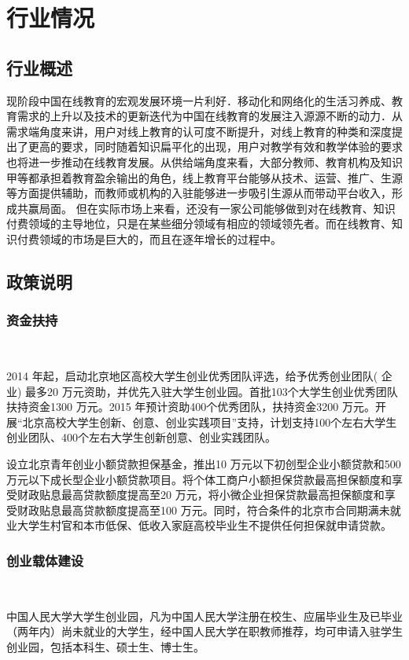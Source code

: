 \setcounter{page}{1}
\section{行业情况}
\subsection{行业概述}
现阶段中国在线教育的宏观发展环境一片利好．移动化和网络化的生活习养成、教育需求的上升以及技术的更新迭代为中国在线教育的发展注入源源不断的动力．从需求端角度来讲，用户对线上教育的认可度不断提升，对线上教育的种类和深度提出了更高的要求，同时随着知识扁平化的出现，用户对教学有效和教学体验的要求也将进一步推动在线教育发展。从供给端角度来看，大部分教师、教育机构及知识甲等都承担着教育盈余输出的角色，线上教育平台能够从技术、运营、推广、生源等方面提供辅助，而教师或机构的入驻能够进一步吸引生源从而带动平台收入，形成共赢局面。
但在实际市场上来看，还没有一家公司能够做到对在线教育、知识付费领域的主导地位，只是在某些细分领域有相应的领域领先者。而在线教育、知识付费领域的市场是巨大的，而且在逐年增长的过程中。
\subsection{政策说明}
\subsubsection{资金扶持}\

2014 年起，启动北京地区高校大学生创业优秀团队评选，给予优秀创业团队( 企业) 最多20 万元资助，并优先入驻大学生创业园。首批103个大学生创业优秀团队扶持资金1300 万元。2015 年预计资助400个优秀团队，扶持资金3200 万元。开展“北京高校大学生创新、创意、创业实践项目”支持，计划支持100个左右大学生创业团队、400个左右大学生创新创意、创业实践团队。

设立北京青年创业小额贷款担保基金，推出10 万元以下初创型企业小额贷款和500 万元以下成长型企业小额贷款项目。将个体工商户小额担保贷款最高担保额度和享受财政贴息最高贷款额度提高至20 万元，将小微企业担保贷款最高担保额度和享受财政贴息最高贷款额度提高至100 万元。同时，符合条件的北京市合同期满未就业大学生村官和本市低保、低收入家庭高校毕业生不提供任何担保就申请贷款。

\subsubsection{创业载体建设}\

中国人民大学大学生创业园，凡为中国人民大学注册在校生、应届毕业生及已毕业（两年内）尚未就业的大学生，经中国人民大学在职教师推荐，均可申请入驻学生创业园，包括本科生、硕士生、博士生。


